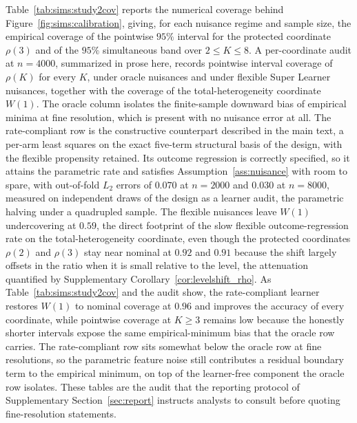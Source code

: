 \documentclass[11pt]{article}
\begin{document}
Table~\ref{tab:sims:study2cov} reports the numerical coverage behind Figure~\ref{fig:sims:calibration}, giving, for each nuisance regime and sample size, the empirical coverage of the pointwise $95\%$ interval for the protected coordinate $\rho(3)$ and of the $95\%$ simultaneous band over $2\le K\le8$. A per-coordinate audit at $n=4000$, summarized in prose here, records pointwise interval coverage of $\rho(K)$ for every $K$, under oracle nuisances and under flexible Super Learner nuisances, together with the coverage of the total-heterogeneity coordinate $W(1)$. The oracle column isolates the finite-sample downward bias of empirical minima at fine resolution, which is present with no nuisance error at all. The rate-compliant row is the constructive counterpart described in the main text, a per-arm least squares on the exact five-term structural basis of the design, with the flexible propensity retained. Its outcome regression is correctly specified, so it attains the parametric rate and satisfies Assumption~\ref{ass:nuisance} with room to spare, with out-of-fold $L_2$ errors of $0.070$ at $n=2000$ and $0.030$ at $n=8000$, measured on independent draws of the design as a learner audit, the parametric halving under a quadrupled sample. The flexible nuisances leave $W(1)$ undercovering at $0.59$, the direct footprint of the slow flexible outcome-regression rate on the total-heterogeneity coordinate, even though the protected coordinates $\rho(2)$ and $\rho(3)$ stay near nominal at $0.92$ and $0.91$ because the shift largely offsets in the ratio when it is small relative to the level, the attenuation quantified by Supplementary Corollary~\ref{cor:levelshift_rho}. As Table~\ref{tab:sims:study2cov} and the audit show, the rate-compliant learner restores $W(1)$ to nominal coverage at $0.96$ and improves the accuracy of every coordinate, while pointwise coverage at $K\ge3$ remains low because the honestly shorter intervals expose the same empirical-minimum bias that the oracle row carries. The rate-compliant row sits somewhat below the oracle row at fine resolutions, so the parametric feature noise still contributes a residual boundary term to the empirical minimum, on top of the learner-free component the oracle row isolates. These tables are the audit that the reporting protocol of Supplementary Section~\ref{sec:report} instructs analysts to consult before quoting fine-resolution statements.
\end{document}
